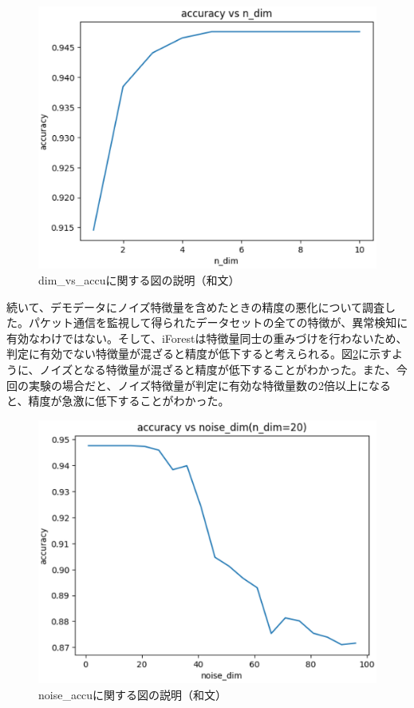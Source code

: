 \documentclass{css}
\begin{document}
\begin{figure}[tb]
    \centering
    \includegraphics[width=\linewidth]{pictures/eps/dim_vs_accu.eps}
    \caption{dim\_vs\_accuに関する図の説明（和文）}
    \label{fig:dim_vs_accu}
\end{figure}

続いて、デモデータにノイズ特徴量を含めたときの精度の悪化について調査した。パケット通信を監視して得られたデータセットの全ての特徴が、異常検知に有効なわけではない。そして、iForestは特徴量同士の重みづけを行わないため、判定に有効でない特徴量が混ざると精度が低下すると考えられる。図\ref{fig:noise_accu}に示すように、ノイズとなる特徴量が混ざると精度が低下することがわかった。また、今回の実験の場合だと、ノイズ特徴量が判定に有効な特徴量数の2倍以上になると、精度が急激に低下することがわかった。

\begin{figure}[tb]
    \centering
    \includegraphics[width=\linewidth]{pictures/eps/noise_accu.eps}
    \caption{noise\_accuに関する図の説明（和文）}
    \label{fig:noise_accu}
\end{figure}
\end{document}
